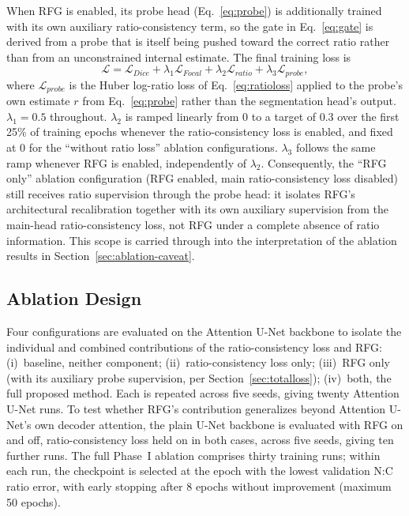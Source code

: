 \documentclass[pdflatex,sn-mathphys-num]{sn-jnl}%
\theoremstyle{thmstyleone}%
\theoremstyle{thmstyletwo}%
\theoremstyle{thmstylethree}%
\begin{document}
When RFG is enabled, its probe head (Eq.~\eqref{eq:probe}) is additionally trained with its own auxiliary ratio-consistency term, so the gate in Eq.~\eqref{eq:gate} is derived from a probe that is itself being pushed toward the correct ratio rather than from an unconstrained internal estimate. The final training loss is
\begin{equation}
\mathcal{L}=\mathcal{L}_{Dice}+\lambda_1\mathcal{L}_{Focal}+\lambda_2\mathcal{L}_{ratio}+\lambda_3\mathcal{L}_{probe},
\label{eq:totalloss}
\end{equation}
where $\mathcal{L}_{probe}$ is the Huber log-ratio loss of Eq.~\eqref{eq:ratioloss} applied to the probe's own estimate $r$ from Eq.~\eqref{eq:probe} rather than the segmentation head's output. $\lambda_1=0.5$ throughout. $\lambda_2$ is ramped linearly from 0 to a target of 0.3 over the first 25\% of training epochs whenever the ratio-consistency loss is enabled, and fixed at 0 for the ``without ratio loss'' ablation configurations. $\lambda_3$ follows the same ramp whenever RFG is enabled, independently of $\lambda_2$. Consequently, the ``RFG only'' ablation configuration (RFG enabled, main ratio-consistency loss disabled) still receives ratio supervision through the probe head: it isolates RFG's architectural recalibration together with its own auxiliary supervision from the main-head ratio-consistency loss, not RFG under a complete absence of ratio information. This scope is carried through into the interpretation of the ablation results in Section~\ref{sec:ablation-caveat}.

\subsection{Ablation Design}

Four configurations are evaluated on the Attention U-Net backbone to isolate the individual and combined contributions of the ratio-consistency loss and RFG: (i)~baseline, neither component; (ii)~ratio-consistency loss only; (iii)~RFG only (with its auxiliary probe supervision, per Section~\ref{sec:totalloss}); (iv)~both, the full proposed method. Each is repeated across five seeds, giving twenty Attention U-Net runs. To test whether RFG's contribution generalizes beyond Attention U-Net's own decoder attention, the plain U-Net backbone is evaluated with RFG on and off, ratio-consistency loss held on in both cases, across five seeds, giving ten further runs. The full Phase~I ablation comprises thirty training runs; within each run, the checkpoint is selected at the epoch with the lowest validation N:C ratio error, with early stopping after 8 epochs without improvement (maximum 50 epochs).
\end{document}
